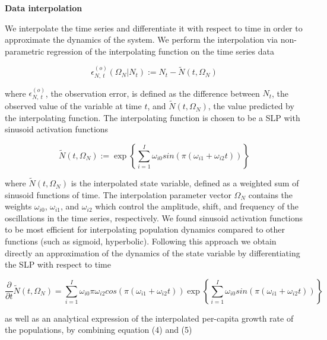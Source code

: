 \documentclass[11pt, oneside]{article}
\begin{document}
\textbf{Data interpolation}

We interpolate the time series and differentiate it with respect to time in order to approximate the dynamics of the system.
We perform the interpolation via non-parametric regression of the interpolating function on the time series data

\vspace{-0.5cm}
\begin{equation}
    \epsilon^{(o)}_{N,~t}(\Omega_N | N_t) := N_t - \tilde{N}(t,\Omega_N)
\end{equation}

where $\epsilon^{(o)}_{N,~t}$, the observation error, is defined as the difference between $N_t$, the observed value of the variable at time $t$, and $\tilde{N}(t,\Omega_N)$, the value predicted by the interpolating function. 
The interpolating function is chosen to be a SLP with sinusoid activation functions

\vspace{-0.5cm}
\begin{equation}
    \tilde{N}(t,\Omega_N) := \exp \left \{ \sum_{i=1}^{I} \omega_{i0} sin \left(\pi (\omega_{i1} + \omega_{i2} t) \right) \right \}
\end{equation}

where $\tilde{N}(t,\Omega_N)$ is the interpolated state variable, defined as a weighted sum of sinusoid functions of time.
The interpolation parameter vector $\Omega_N$ contains the weights $\omega_{i0}$, $\omega_{i1}$, and $\omega_{i2}$ which control the amplitude, shift, and frequency of the oscillations in the time series, respectively.
We found sinusoid activation functions to be most efficient for interpolating population dynamics compared to other functions (such as sigmoid, hyperbolic).
Following this approach we obtain directly an approximation of the dynamics of the state variable by differentiating the SLP with respect to time

\vspace{-0.5cm}
\begin{equation}
	\frac{\partial}{\partial t} \tilde{N}(t, \Omega_N) = \sum_{i=1}^{I} \omega_{i0} \pi \omega_{i2} cos \left(\pi (\omega_{i1} + \omega_{i2} t) \right) \exp \left \{ \sum_{i=1}^{I} \omega_{i0} sin \left(\pi (\omega_{i1} + \omega_{i2} t) \right) \right \}
\end{equation}

as well as an analytical expression of the interpolated per-capita growth rate of the populations, by combining equation (4) and (5)
\end{document}
